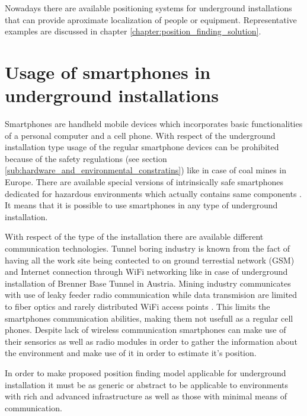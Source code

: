 \documentclass[../main.tex]{subfiles}
\begin{document}

Nowadays there are available positioning systems for underground installations that can provide aproximate localization of people or equipment. Representative examples are discussed in chapter \ref{chapter:position_finding_solution}.


\section{Usage of smartphones in underground installations}

Smartphones are handheld mobile devices which incorporates basic functionalities of a personal computer and a cell phone. With respect of the underground installation type usage of the regular smartphone devices can be prohibited because of the safety regulations (see section \ref{sub:hardware_and_environmental_constratins}) like in case of coal mines in Europe\cite{Thesis_CM}. There are available special versions of intrinsically safe smartphones dedicated for hazardous environments which actually contains same components \cite{misc_atex_smartphone_brochure}. It means that it is possible to use smartphones in any type of underground installation.

With respect of the type of the installation there are available different communication technologies. Tunnel boring industry is known from the fact of having all the work site being contected to on ground terrestial network (GSM) and Internet connection through WiFi networking like in case of underground installation of Brenner Base Tunnel in Austria. Mining industry communicates with use of leaky feeder radio communication while data transmision are limited to fiber optics and rarely distributed WiFi access points \cite{thesis_tablet_positioning}. This limits the smartphones communication abilities, making them not usefull as a regular cell phones. Despite lack of wireless communication smartphones can make use of their sensorics as well as radio modules in order to gather the information about the environment and make use of it in order to estimate it's position.

In order to make proposed position finding model applicable for underground installation it must be as generic or abstract to be applicable to environments with rich and advanced infrastructure as well as those with minimal means of communication.
\end{document}
